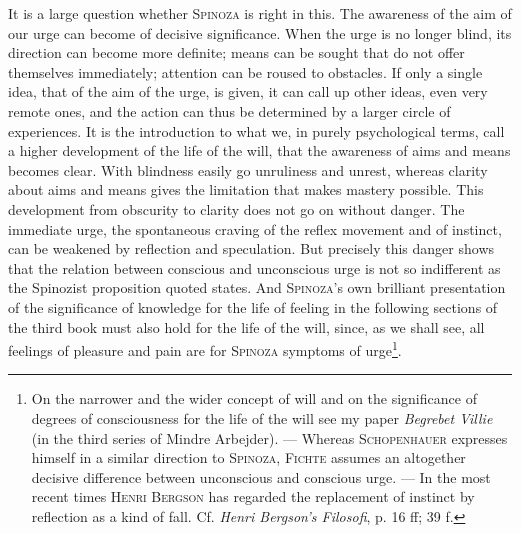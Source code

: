 \documentclass[12pt]{article}
\begin{document}
It is a large question whether \textsc{Spinoza} is right in this. The awareness of the aim of our
urge can become of decisive significance. When the urge is no longer blind, its direction can
become more definite; means can be sought that do not offer themselves immediately; attention can
be roused to obstacles. If only a single idea, that of the aim of the urge, is given, it can call
up other ideas, even very remote ones, and the action can thus be determined by a larger circle of
experiences. It is the introduction to what we, in purely psychological terms, call a higher
development of the life of the will, that the awareness of aims and means becomes clear. With
blindness easily go unruliness and unrest, whereas clarity about aims and means gives the
limitation that makes mastery possible. This development from obscurity to clarity does not go
on without danger. The immediate urge, the spontaneous craving of the reflex movement and of
instinct, can be weakened by reflection and speculation. But precisely this danger shows that the
relation between conscious and unconscious urge is not so indifferent as the Spinozist
proposition quoted states. And \textsc{Spinoza}'s own brilliant presentation of the significance
of knowledge for the life of feeling in the following sections of the third book must also hold
for the life of the will, since, as we shall see, all feelings of pleasure and pain are for
\textsc{Spinoza} symptoms of urge\footnote{On the narrower and the wider concept of will and on
the significance of degrees of consciousness for the life of the will see my paper
\textit{Begrebet Villie} (in the third series of Mindre Arbejder). --- Whereas
\textsc{Schopenhauer} expresses himself in a similar direction to \textsc{Spinoza},
\textsc{Fichte} assumes an altogether decisive difference between unconscious and conscious urge.
--- In the most recent times \textsc{Henri Bergson} has regarded the replacement of instinct by
reflection as a kind of fall. Cf. \textit{Henri Bergson's Filosofi}, p. 16 ff; 39 f.}.
\end{document}
